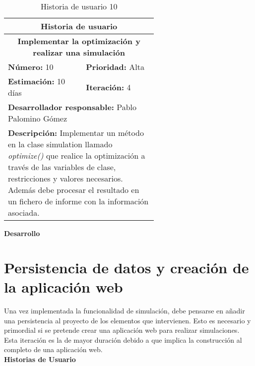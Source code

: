 \begin{table}[H]
        \centering
        \begin{tabular}{|p{0.3\linewidth}|p{0.3\linewidth}|}
          \hline
          \multicolumn{2}{|c|}{Historia de usuario}\\ \hline
          \multicolumn{2}{|c|}{\textbf{Implementar la optimización y realizar una simulación}}\\ \hline
          \textbf{Número:} 10 & \textbf{Prioridad:} Alta\\ \hline
          \textbf{Estimación:} 10 días & \textbf{Iteración:} 4\\ \hline
          \multicolumn{2}{|l|}{\textbf{Desarrollador responsable:} Pablo Palomino Gómez}\\ \hline
          \multicolumn{2}{|p{0.6\linewidth}|}{\textbf{Descripción:} Implementar un método en la clase simulation llamado \textit{optimize()} que realice la optimización a través de las variables de clase, restricciones y valores necesarios. Además debe procesar el resultado en un fichero de informe con la información asociada.}\\ \hline
        \end{tabular}
        \caption{Historia de usuario 10}
        \label{tab:hist10}
\end{table}
\textbf{Desarrollo}\\


\section{Persistencia de datos y creación de la aplicación web}
\label{sec:hito5}
Una vez implementada la funcionalidad de simulación, debe pensarse en añadir una persistencia al proyecto de los elementos que intervienen. Esto es necesario y primordial si se pretende crear una aplicación web para realizar simulaciones. Esta iteración es la de mayor duración debido a que implica la construcción al completo de una aplicación web.\\

\textbf{Historias de Usuario}\\

